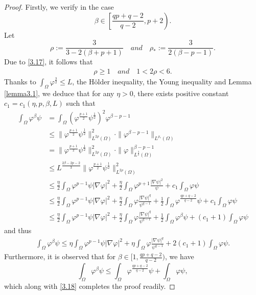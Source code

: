 \documentclass[12pt]{article}
\theoremstyle{plain}
\theoremstyle{definition}
\numberwithin{equation}{section}
\begin{document}
\begin{proof}
Firstly, we verify in the case
\begin{equation}\label{3.17}
\beta \in \left[\frac{qp+q-2}{q-2},p+2\right).
\end{equation}
Let
$$\rho:=\frac{3}{3-2(\beta+p+1)}\quad and \quad \rho_*:=\frac{3}{2(\beta-p-1)}.$$
Due to \eqref{3.17}, it follows that
    \begin{align*}
        \rho\geq1\quad and\quad 1<2\rho<6.
    \end{align*}
Thanks to  $\int_{\Omega}\varphi^{\frac{3}{2}}\leq L$, the H\"{o}lder inequality, the Young inequality and Lemma \ref{lemma3.1},  we deduce that for any $\eta>0$, there exists
positive constant  $c_1=c_1(\eta,p,\beta,L)$  such that
\begin{align*}
    \int_{\Omega}\varphi^{\beta}\psi&=\int_{\Omega}(\varphi^{\frac{p+1}{2}}\psi^{\frac{1}{2}})^2\varphi^{\beta-p-1}\nonumber
    \\
    &\leq\|\varphi^{\frac{p+1}{2}}\psi^{\frac{1}{2}}\|^2_{L^{2\rho}(\Omega)}\cdot\|\varphi^{\beta-p-1}\|_{L^{\rho_*}(\Omega)}\nonumber
    \\
    &=\|\varphi^{\frac{p+1}{2}}\psi^{\frac{1}{2}}\|^2_{L^{2\rho}(\Omega)}
    \cdot\|\varphi\|_{L^{\frac3 2}(\Omega)}^{\beta-p-1}\nonumber
    \\
    &\leq L^{\frac {2\beta-2p-2}{3}}\|\varphi^{\frac{p+1}{2}}\psi^{\frac{1}{2}}\|^2_{L^{2\rho}(\Omega)}\nonumber
    \\
    &\leq \frac{\eta}{2}\int_{\Omega}\varphi^{p-1}\psi|\nabla
    \varphi|^2+\frac{\eta}{2}\int_{\Omega}\varphi^{p+1}\frac{|\nabla
    \psi|^2}{\psi}+c_1\int_{\Omega}\varphi\psi\nonumber
    \\
    &\leq \frac{\eta}{2}\int_{\Omega}\varphi^{p-1}\psi|\nabla
    \varphi|^2+\frac{\eta}{2}\int_{\Omega}\varphi\frac{|\nabla
    \psi|^q}{\psi^{q-1}}+\frac 12\int_{\Omega}\varphi^{\frac{qp+q-2}{q-2}}\psi+c_1\int_{\Omega}\varphi\psi\nonumber
     \\
    &\leq \frac{\eta}{2}\int_{\Omega}\varphi^{p-1}\psi|\nabla
    \varphi|^2+\frac{\eta}{2}\int_{\Omega}\varphi\frac{|\nabla
    \psi|^q}{\psi^{q-1}}+
    \frac{1}{2}\int_{\Omega}\varphi^{\beta}\psi+
    (c_1+1)\int_{\Omega}\varphi\psi
\end{align*}
 and thus
\begin{align}\label{3.18}
 \int_{\Omega}\varphi^{\beta}\psi\leq \eta\int_{\Omega}\varphi^{p-1}\psi|\nabla
\varphi|^2+\eta\int_{\Omega}\varphi\frac{|\nabla
\psi|^q}{\psi^{q-1}}+2 (c_1+1) \int_{\Omega}\varphi\psi.
\end{align}
Furthermore, it is observed that  for $\beta \in [1, \frac{qp+q-2}{q-2})$, we have $$\int_{\Omega}\varphi^{\beta}\psi\leq
    \int_{\Omega}\varphi^{\frac{qp+q-2}{q-2}}\psi+\int_{\Omega}\varphi\psi, $$
which along with \eqref{3.18}  completes the proof readily.
\end{proof}
\end{document}
